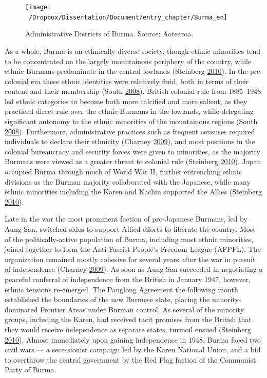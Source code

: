 \documentclass[12pt,]{book}
\theoremstyle{definition}
\theoremstyle{definition}
\theoremstyle{remark}
\begin{document}
\begin{figure}

{\centering \texttt{[image: ~/Dropbox/Dissertation/Document/entry\_chapter/Burma\_en]} 

}

\caption{Administrative Districts of Burma. Source: Aotearoa.}\label{fig:burmamap}
\end{figure}

As a whole, Burma is an ethnically diverse society, though ethnic
minorities tend to be concentrated on the largely mountainous periphery
of the country, while ethnic Burmans predominate in the central lowlands
(Steinberg \protect\hyperlink{ref-Steinberg2010}{2010}). In the
pre-colonial era these ethnic identities were relatively fluid, both in
terms of their content and their membership (South
\protect\hyperlink{ref-South2008}{2008}). British colonial rule from
1885--1948 led ethnic categories to become both more calcified and more
salient, as they practiced direct rule over the ethnic Burmans in the
lowlands, while delegating significant autonomy to the ethnic minorities
of the mountainous regions (South
\protect\hyperlink{ref-South2008}{2008}). Furthermore, administrative
practices such as frequent censuses required individuals to declare
their ethnicity (Charney \protect\hyperlink{ref-Charney2009}{2009}), and
most positions in the colonial bureaucracy and security forces were
given to minorities, as the majority Burmans were viewed as a greater
threat to colonial rule (Steinberg
\protect\hyperlink{ref-Steinberg2010}{2010}). Japan occupied Burma
through much of World War II, further entrenching ethnic divisions as
the Burman majority collaborated with the Japanese, while many ethnic
minorities including the Karen and Kachin supported the Allies
(Steinberg \protect\hyperlink{ref-Steinberg2010}{2010}).

Late in the war the most prominent faction of pro-Japanese Burmans, led
by Aung San, switched sides to support Allied efforts to liberate the
country. Most of the politically-active population of Burma, including
most ethnic minorities, joined together to form the Anti-Fascist
People's Freedom League (AFPFL). The organization remained mostly
cohesive for several years after the war in pursuit of independence
(Charney \protect\hyperlink{ref-Charney2009}{2009}). As soon as Aung San
succeeded in negotiating a peaceful conferral of independence from the
British in January 1947, however, ethnic tensions re-emerged. The
Panglong Agreement the following month established the boundaries of the
new Burmese state, placing the minority-dominated Frontier Areas under
Burman control. As several of the minority groups, including the Karen,
had received tacit promises from the British that they would receive
independence as separate states, turmoil ensued (Steinberg
\protect\hyperlink{ref-Steinberg2010}{2010}). Almost immediately upon
gaining independence in 1948, Burma faced two civil wars --- a
secessionist campaign led by the Karen National Union, and a bid to
overthrow the central government by the Red Flag faction of the
Communist Party of Burma.
\end{document}
